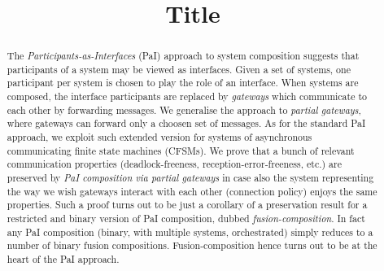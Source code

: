 \documentclass[copyright,creativecommons]{eptcs}
\author{
}
\begin{document}

\title{Title%
}

\def\titlerunning{Partial Fusion}
\def\authorrunning{
}

\maketitle

\begin{abstract}
The {\em Participants-as-Interfaces\/} (PaI) approach to system composition 
suggests that participants of a system may be viewed as interfaces.
Given a set of systems,
one participant per system is chosen to play the role of an interface. When systems are composed, the %
interface participants are replaced by  \emph{gateways} which communicate to each other
by forwarding messages.
We generalise the approach to 
\emph{partial gateways}, where 
gateways can forward only a choosen
set of messages. 
As for the standard PaI approach, we exploit such extended version for
systems of asynchronous  communicating finite state machines (CFSMs).
We prove that a bunch of relevant 
communication properties (deadlock-freeness, reception-error-freeness, etc.) are preserved by {\em PaI composition via partial gateways\/} in case also the
system representing the way we wish gateways interact with each other (connection policy) enjoys the same properties.
Such a proof turns out to be just a corollary of a preservation result for a restricted
and binary version of PaI composition, dubbed \emph{fusion-composition}.
In fact any 
PaI composition (binary, with multiple systems, orchestrated) simply reduces
to a number of binary fusion compositions.
Fusion-composition hence turns out to be at the heart of the PaI approach.
\end{abstract}





%
%

%
%
\setlength{\abovedisplayskip}{6pt}
\setlength{\belowdisplayskip}{\abovedisplayskip}
\end{document}
